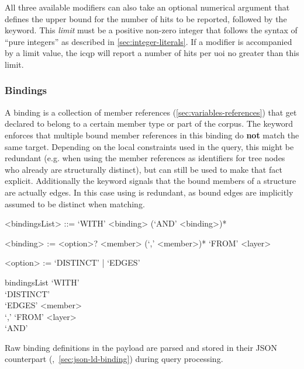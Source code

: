 \documentclass[11pt,a4paper]{article}
\begin{document}
All three available modifiers can also take an optional numerical argument that defines the upper bound for the number of hits to be reported, followed by the  keyword.
This \textit{limit} must be a positive non-zero integer that follows the syntax of ``pure integers'' as described in \cref{sec:integer-literals}.
If a modifier is accompanied by a limit value, the \ac{icqp} will report a number of hits per \ac{uoi} no greater than this limit.

\subsubsection{Bindings}
\label{sec:bindings}
A binding is a collection of member references (\ref{sec:variables-references}) that get declared to belong to a certain member type or part of the corpus. 
The  keyword enforces that multiple bound member references in this binding do \textbf{not} match the same target. 
Depending on the local constraints used in the query, this might be redundant (e.g. when using the member references as identifiers for tree nodes who already are structurally distinct), but can still be used to make that fact explicit. 
Additionally the  keyword signals that the bound members of a structure are actually edges.
In this case using  is redundant, as bound edges are implicitly assumed to be distinct when matching.

\begin{gram}[Bindings]
	\label{gram:bindings}
	\begin{grammar}	
		<bindingsList> ::= `WITH' <binding> (`AND' <binding>)* 
		
		<binding> := <option>? <member> (`,' <member>)* `FROM' <layer>
		
		<option> := `DISTINCT' | `EDGES'	
	\end{grammar}
	\diagsep
	\begin{rrdiag*}{bindingsList}
		`WITH' \srp
			\sst \\ `DISTINCT' \\ `EDGES' \est {} \\ `,' \erp `FROM' <layer>
			\\ `AND'
		\erp 
	\end{rrdiag*}
\end{gram}

\noindent Raw binding definitions in the payload are parsed and stored in their JSON counterpart (,~\ref{sec:json-ld-binding}) during query processing.
\end{document}
